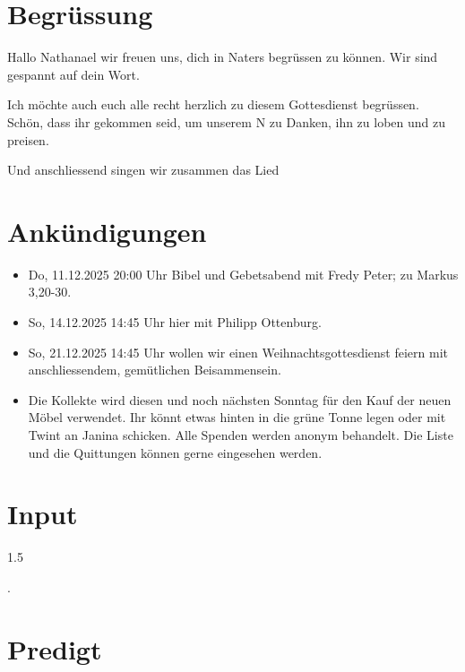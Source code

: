 \documentclass{mybib}
\begin{document}
\section{Begrüssung}
Hallo Nathanael wir freuen uns, dich in Naters begrüssen zu können. Wir sind gespannt auf dein Wort.

Ich möchte auch euch alle recht herzlich zu diesem Gottesdienst begrüssen. Schön, dass ihr gekommen seid, um unserem \herr N zu Danken, ihn zu loben und zu preisen.

\beten{} Und anschliessend singen wir zusammen das Lied


\section{Ankündigungen}
\begin{itemize}
    \item {} Do, 11.12.2025 20:00 Uhr Bibel und Gebetsabend mit Fredy Peter; zu Markus 3,20-30.
    \item {} So, 14.12.2025 14:45 Uhr hier mit Philipp Ottenburg.
    \item {} So, 21.12.2025 14:45 Uhr wollen wir einen Weihnachtsgottesdienst feiern mit anschliessendem, gemütlichen Beisammensein.
    \item {} Die Kollekte wird diesen und noch nächsten Sonntag für den Kauf der neuen Möbel verwendet. Ihr könnt etwas hinten in die grüne Tonne legen oder mit Twint an Janina schicken. Alle Spenden werden anonym behandelt. Die Liste und die Quittungen können gerne eingesehen werden.
\end{itemize}

\section{ Input }
\begin{spacing}{1.5}
    
    .
   
\end{spacing}

\section{Predigt}
\end{document}
